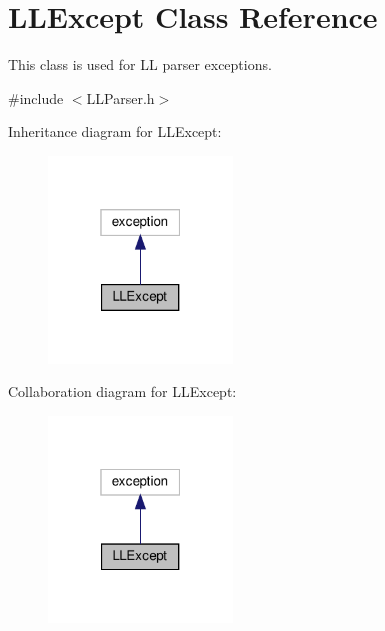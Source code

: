 \hypertarget{classLLExcept}{}\section{L\+L\+Except Class Reference}
\label{classLLExcept}


This class is used for LL parser exceptions.  




{\ttfamily \#include $<$L\+L\+Parser.\+h$>$}



Inheritance diagram for L\+L\+Except\+:
\nopagebreak
\begin{figure}[H]
\begin{center}
\leavevmode
\includegraphics[width=139pt]{classLLExcept__inherit__graph}
\end{center}
\end{figure}


Collaboration diagram for L\+L\+Except\+:
\nopagebreak
\begin{figure}[H]
\begin{center}
\leavevmode
\includegraphics[width=139pt]{classLLExcept__coll__graph}
\end{center}
\end{figure}
